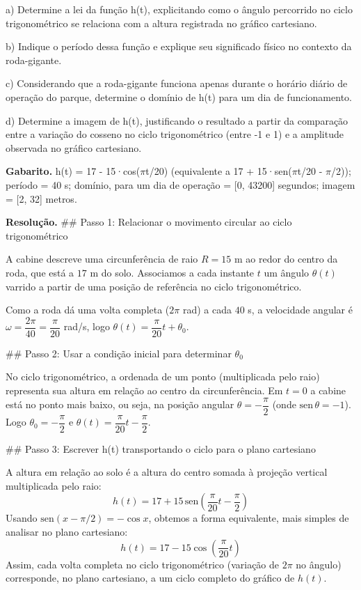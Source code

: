 \documentclass[11pt,a4paper]{article}
\begin{document}
a) Determine a lei da função h(t), explicitando como o ângulo percorrido no ciclo trigonométrico se relaciona com a altura registrada no gráfico cartesiano.

b) Indique o período dessa função e explique seu significado físico no contexto da roda-gigante.

c) Considerando que a roda-gigante funciona apenas durante o horário diário de operação do parque, determine o domínio de h(t) para um dia de funcionamento.

d) Determine a imagem de h(t), justificando o resultado a partir da comparação entre a variação do cosseno no ciclo trigonométrico (entre -1 e 1) e a amplitude observada no gráfico cartesiano.

\textbf{Gabarito.} h(t) = 17 - 15·cos($\pi$t/20) (equivalente a 17 + 15·sen($\pi$t/20 - $\pi$/2)); período = 40 s; domínio, para um dia de operação = [0, 43200] segundos; imagem = [2, 32] metros.

\textbf{Resolução.} \#\# Passo 1: Relacionar o movimento circular ao ciclo trigonométrico

A cabine descreve uma circunferência de raio $R=15$ m ao redor do centro da roda, que está a $17$ m do solo. Associamos a cada instante $t$ um ângulo $\theta(t)$ varrido a partir de uma posição de referência no ciclo trigonométrico.

Como a roda dá uma volta completa ($2\pi$ rad) a cada $40$ s, a velocidade angular é $\omega = \dfrac{2\pi}{40} = \dfrac{\pi}{20}$ rad/s, logo $\theta(t) = \dfrac{\pi}{20}t + \theta_0$.

\#\# Passo 2: Usar a condição inicial para determinar $\theta_0$

No ciclo trigonométrico, a ordenada de um ponto (multiplicada pelo raio) representa sua altura em relação ao centro da circunferência. Em $t=0$ a cabine está no ponto mais baixo, ou seja, na posição angular $\theta = -\dfrac{\pi}{2}$ (onde $\text{sen}\,\theta=-1$). Logo $\theta_0=-\dfrac{\pi}{2}$ e $\theta(t)=\dfrac{\pi}{20}t-\dfrac{\pi}{2}$.

\#\# Passo 3: Escrever h(t) transportando o ciclo para o plano cartesiano

A altura em relação ao solo é a altura do centro somada à projeção vertical multiplicada pelo raio:
$$h(t)=17+15\,\text{sen}\left(\dfrac{\pi}{20}t-\dfrac{\pi}{2}\right)$$
Usando $\text{sen}(x-\pi/2)=-\cos x$, obtemos a forma equivalente, mais simples de analisar no plano cartesiano:
$$h(t)=17-15\cos\left(\dfrac{\pi}{20}t\right)$$
Assim, cada volta completa no ciclo trigonométrico (variação de $2\pi$ no ângulo) corresponde, no plano cartesiano, a um ciclo completo do gráfico de $h(t)$.
\end{document}
